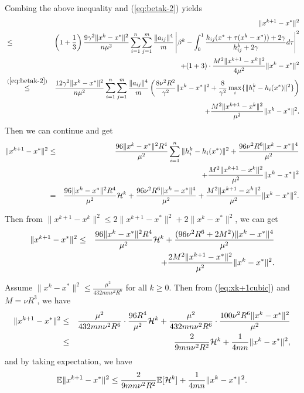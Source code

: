 \documentclass[12pt]{article}
\newcommand{\newalpha}{h}
\begin{document}
\noindent Combing the above inequality and (\ref{eq:betak-2}) yields 
\begin{eqnarray*}
	&&\|x^{k+1} - x^*\|^2\\
	&\leq& \left(  1 + \frac{1}{3}  \right) \frac{9\gamma^2 \|x^k - x^*\|^2}{n \mu^2} \sum_{i=1}^n \sum_{j=1}^{m} \frac{\|a_{ij}\|^4}{m} \left|   \beta^k - \int_{0}^1 \frac{\newalpha_{ij}(x^* + \tau(x^k - x^*)) + 2\gamma}{ h_{ij}^k + 2\gamma} d\tau   \right|^2 \\
	&& + (1 + 3) \cdot \frac{M^2\|x^{k+1} - x^k\|^2}{4\mu^2} \| x^k - x^* \|^2 \\
	&\overset{(\ref{eq:betak-2})}{\leq}& \frac{12 \gamma^2\|x^k - x^*\|^2}{n \mu^2} \sum_{i=1}^n \sum_{j=1}^{m} \frac{\|a_{ij}\|^4}{m} \left(  \frac{8\nu^2 R^2}{\gamma^2} \|x^k - x^*\|^2 + \frac{8}{\gamma^2} \max_{i} \{\|h_i^k - \newalpha_i(x^*)\|^2 \}    \right) \\ 
	&& +  \frac{M^2\|x^{k+1} - x^k\|^2}{\mu^2} \| x^k - x^* \|^2.
\end{eqnarray*}
Then we can continue and get
\begin{eqnarray*}\|x^{k+1} - x^*\|^2 &\leq&  \frac{96\|x^k - x^*\|^2 R^4}{\mu^2} \sum_{i=1}^n \|h_i^k - \newalpha_i(x^*)\|^2 +   \frac{96\nu^2 R^6\|x^k - x^*\|^4 }{\mu^2}\\
	&&\quad +  \frac{M^2\|x^{k+1} - x^k\|^2}{\mu^2} \| x^k - x^* \|^2 \\ 
	&=&  \frac{96\|x^k - x^*\|^2 R^4}{\mu^2}{\cal H}^k  +   \frac{96\nu^2 R^6\|x^k - x^*\|^4 }{\mu^2}+ \frac{M^2\|x^{k+1} - x^k\|^2}{\mu^2} \| x^k - x^* \|^2. 
\end{eqnarray*}

\noindent Then from $\|x^{k+1} - x^k\|^2 \leq 2\|x^{k+1} - x^*\|^2 + 2\|x^k - x^*\|^2$, we can get 
\begin{eqnarray}\label{eq:xk+1cubic}
\|x^{k+1} - x^*\|^2 &\leq& \frac{96\|x^k - x^*\|^2 R^4}{\mu^2}{\cal H}^k+\frac{(96\nu^2 R^6 + 2M^2) \|x^k - x^*\|^4 }{\mu^2}\notag\\
&& \quad + \frac{2M^2\|x^{k+1} - x^*\|^2}{\mu^2} \| x^k - x^* \|^2. 
\end{eqnarray}


\noindent Assume $\|x^k - x^*\|^2 \leq \frac{\mu^2}{432m n \nu^2R^6}$ for all $k\geq 0$. Then from (\ref{eq:xk+1cubic}) and $M=\nu R^3$, we have 
\begin{eqnarray*}
	\|x^{k+1} - x^*\|^2 &\leq& \frac{\mu^2}{432mn\nu^2 R^6} \cdot \frac{96R^4}{\mu^2}{\cal H}^k + \frac{\mu^2}{432mn\nu^2 R^6} \cdot \frac{ 100\nu^2 R^6\|x^k-x^*\|^2}{\mu^2} \\ 
	&\leq& \frac{2}{9mn \nu^2 R^2} {\cal H}^k + \frac{1}{4mn} \|x^k - x^*\|^2, 
\end{eqnarray*}
and by taking expectation, we have 
\begin{equation}\label{eq:expxk+1-cubic}
\mathbb{E}\|x^{k+1} - x^*\|^2 \leq  \frac{2}{9mn \nu^2 R^2} \mathbb{E}[{\cal H}^k] + \frac{1}{4mn} \|x^k - x^*\|^2. 
\end{equation}
\end{document}
